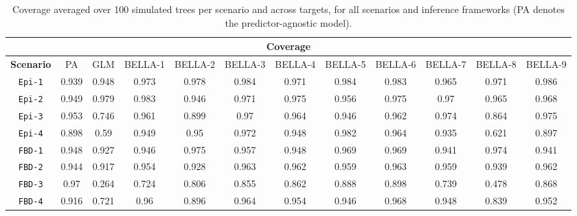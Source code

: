 \begin{landscape}
    \begin{table}[h!]
        \centering
        \begin{tabular}{cccccccccccc}
            \toprule

            \multicolumn{12}{c}{\textbf{Coverage}}                                                                                                                                                                                                                                                                                                      \\
            \midrule

            \textbf{Scenario} & PA                     & GLM                     & BELLA-1                     & BELLA-2                     & BELLA-3                     & BELLA-4                     & BELLA-5                     & BELLA-6                     & BELLA-7                     & BELLA-8                     & BELLA-9                     \\
            \midrule

            \texttt{Epi-1}    & 0.939   & 0.948   & 0.973   & 0.978   & 0.984   & 0.971   & 0.984   & 0.983   & 0.965   & 0.971   & 0.986   \\[6pt]

            \texttt{Epi-2}    & 0.949   & 0.979   & 0.983   & 0.946   & 0.971   & 0.975   & 0.956   & 0.975   & 0.97   & 0.965   & 0.968   \\[6pt]

            \texttt{Epi-3}    & 0.953   & 0.746   & 0.961   & 0.899   & 0.97   & 0.964   & 0.946   & 0.962   & 0.974   & 0.864   & 0.975   \\[6pt]

            \texttt{Epi-4}    & 0.898   & 0.59   & 0.949   & 0.95   & 0.972   & 0.948   & 0.982   & 0.964   & 0.935   & 0.621   & 0.897   \\[6pt]

            \texttt{FBD-1}    & 0.948 & 0.927 & 0.946 & 0.975 & 0.957 & 0.948 & 0.969 & 0.969 & 0.941 & 0.974 & 0.941 \\[6pt]

            \texttt{FBD-2}    & 0.944 & 0.917 & 0.954 & 0.928 & 0.963 & 0.962 & 0.959 & 0.963 & 0.959 & 0.939 & 0.962 \\[6pt]

            \texttt{FBD-3}    & 0.97 & 0.264 & 0.724 & 0.806 & 0.855 & 0.862 & 0.888 & 0.898 & 0.739 & 0.478 & 0.868 \\[6pt]

            \texttt{FBD-4}    & 0.916     & 0.721     & 0.96     & 0.896     & 0.964     & 0.954     & 0.946     & 0.968     & 0.948     & 0.839     & 0.952     \\[6pt]

            \bottomrule
        \end{tabular}
        \caption{Coverage averaged over 100 simulated trees per scenario and across targets, for all scenarios and inference frameworks (PA denotes the predictor-agnostic model). }%
        \label{tab:coverage}
    \end{table}
\end{landscape}
